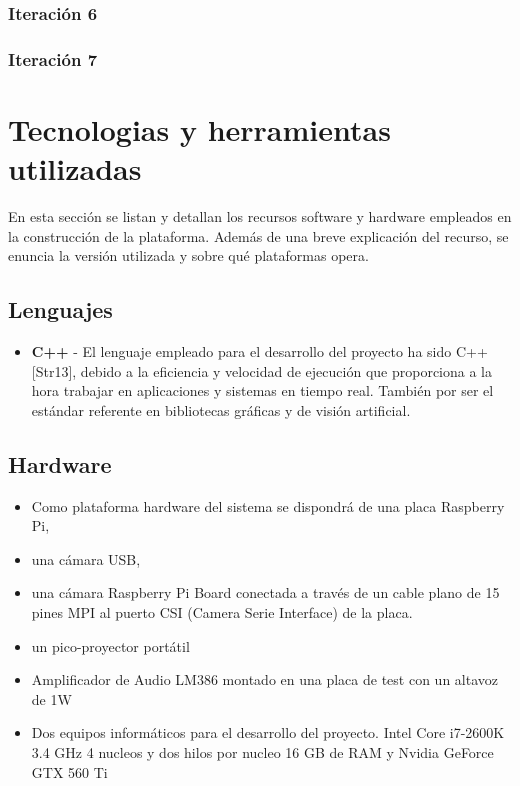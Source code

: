 \subsubsection{Iteración 6}
\subsubsection{Iteración 7}

\section{Tecnologias y herramientas utilizadas}

En esta sección se listan y detallan los recursos software y hardware empleados en la construcción de la plataforma. Además de una breve explicación del recurso, se enuncia la versión utilizada y sobre qué plataformas opera.

\subsection{Lenguajes}
\begin{itemize}
\item \textbf{C++} - El lenguaje empleado para el desarrollo del proyecto ha sido C++ [Str13], debido a la eficiencia y velocidad de ejecución que proporciona a la hora trabajar en aplicaciones y sistemas en tiempo real. También por ser el estándar referente en bibliotecas gráficas y de visión artificial.
\end{itemize}

\subsection{Hardware}
\begin{itemize}
\item Como plataforma hardware del sistema se dispondrá de una placa Raspberry Pi, 
\item una cámara USB, 
\item una cámara Raspberry Pi Board conectada a través de un cable plano de 15 pines MPI al puerto CSI (Camera Serie Interface) de la placa.
\item un pico-proyector portátil 
\item Amplificador de Audio LM386 montado en una placa de test con un altavoz de 1W
\item Dos equipos informáticos para el desarrollo del proyecto. Intel Core i7-2600K 3.4 GHz 4 nucleos y dos hilos por nucleo 16 GB de RAM y Nvidia GeForce GTX 560 Ti

\end{itemize}

